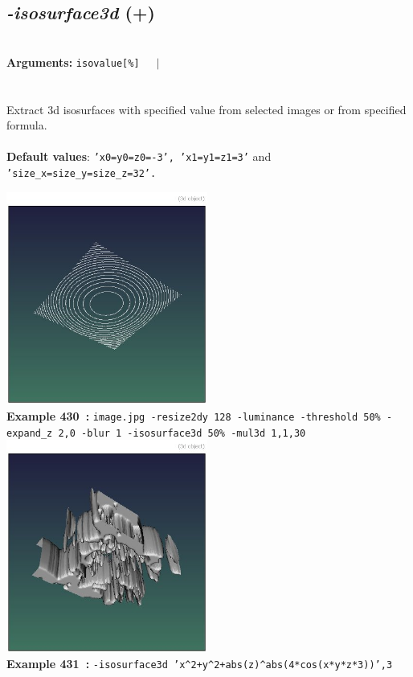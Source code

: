 \documentclass[a4paper,11pt,twoside]{book}
\begin{document}
\subsection{\emph{-isosurface3d} (+)}\vspace*{-0.5em}
~\\\textbf{Arguments: } 
{\small \texttt{isovalue[\%]}}~~~$|$\\
\\~\\
Extract 3d isosurfaces with specified value from selected images or from specified formula.
~\\~\\\textbf{Default values}: {\small \texttt{'x0=y0=z0=-3', 'x1=y1=z1=3'} and \texttt{'size\_x=size\_y=size\_z=32'.}}
\begin{center}\includegraphics[keepaspectratio=true,height=7cm,width=\textwidth]{img/gmic_def430.jpg}\\
{\footnotesize \textbf{Example 430~:} \texttt{image.jpg -resize2dy 128 -luminance -threshold 50\% -expand\_z 2,0 -blur 1 -isosurface3d 50\% -mul3d 1,1,30}}
\\\includegraphics[keepaspectratio=true,height=7cm,width=\textwidth]{img/gmic_def431.jpg}\\
{\footnotesize \textbf{Example 431~:} \texttt{-isosurface3d 'x\textasciicircum 2+y\textasciicircum 2+abs(z)\textasciicircum abs(4*cos(x*y*z*3))',3}}
\end{center}
\end{document}
